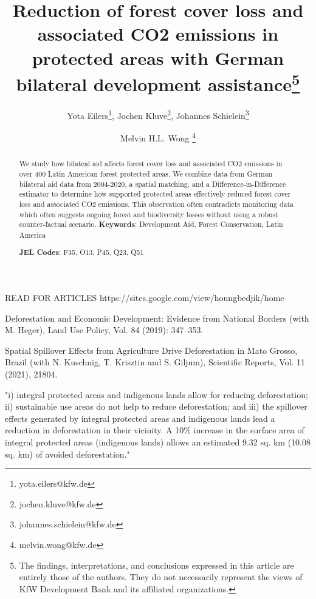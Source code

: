 \documentclass{article}
\title{Reduction of forest cover loss and associated CO2 emissions in protected areas with German bilateral development assistance\thanks{The findings, interpretations, and conclusions expressed in this article are entirely those of the authors. They do not necessarily represent the views of KfW Development Bank and its affiliated organizations.}}
\author{Yota Eilers\thanks{yota.eilers@kfw.de}, Jochen Kluve\thanks{jochen.kluve@kfw.de}, Johannes Schielein\thanks{johannes.schielein@kfw.de} \and Melvin H.L. Wong \thanks{melvin.wong@kfw.de}}
\begin{document}
%
\maketitle
\begin{abstract}
We study how bilateal aid affects forest cover loss and associated CO2 emissions in over 400 Latin American forest protected areas. We combine data from German bilateral aid data from 2004-2020, a spatial matching, and a Difference-in-Difference estimator to determine how supported protected areas effectively reduced forest cover loss and associated CO2 emissions. This observation often contradicts monitoring data which often suggests ongoing forest and biodiversity losses without using a robust counter-factual scenario.
                               \vspace{0.5cm}
                               \noindent\textbf{Keywords}: Development Aid, Forest Conservation, Latin America%
                               
                               \textbf{JEL Codes}: F35, O13, P45, Q23, Q51
                               
                               \vspace{0.5cm}
                \end{abstract}
                
                
                

READ FOR ARTICLES
https://sites.google.com/view/houngbedjik/home


Deforestation and Economic Development: Evidence from National Borders (with M. Heger), Land
Use Policy, Vol. 84 (2019): 347–353.

Spatial Spillover Effects from Agriculture Drive Deforestation in Mato Grosso, Brazil (with N. Kuschnig,
T. Krisztin and S. Giljum), Scientific Reports, Vol. 11 (2021), 21804.


\citep{AMIN2019272} "i) integral protected areas and indigenous lands allow for reducing deforestation; ii) sustainable use areas do not help to reduce deforestation; and iii) the spillover effects generated by integral protected areas and indigenous lands lead a reduction in deforestation in their vicinity. A 10\% increase in the surface area of integral protected areas (indigenous lands) allows an estimated 9.32 sq. km (10.08 sq. km) of avoided deforestation."
\end{document}
